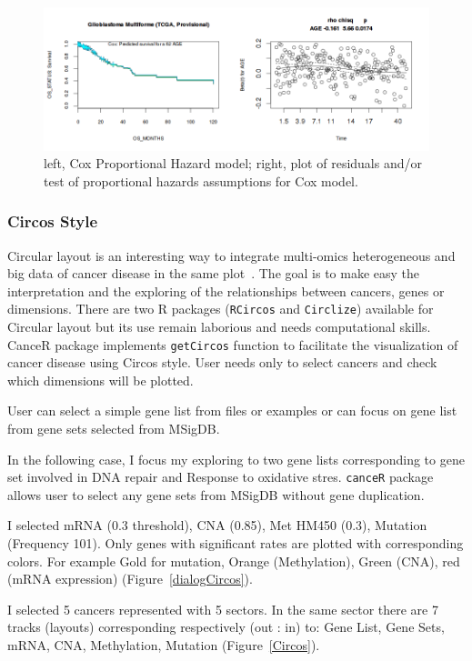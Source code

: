 \documentclass[a4paper]{article}
\begin{document}
 
 \begin{figure}[!ht]
  \centering
 \includegraphics[scale=0.5]{image/Coxph.png}
 \caption{left, Cox Proportional Hazard model; right, plot of residuals and/or test of proportional hazards assumptions for Cox model.}
 \label{Coxph}
 \end{figure}
 
  \subsubsection{Circos Style}
  Circular layout is an interesting way to integrate multi-omics heterogeneous  and big data of cancer disease in the same plot~\cite{Krzywinski2009}. The goal is to make easy the interpretation and the exploring of the relationships between cancers, genes or dimensions. 
There are two R packages (\texttt{RCircos} and \texttt{Circlize}) available for Circular layout but its use remain laborious and needs computational skills. 
CanceR package implements \texttt{getCircos} function to facilitate the visualization of cancer disease using Circos style. User needs only to select cancers and check which dimensions will be plotted.

User can select a simple gene list from files or examples or can focus on gene list from gene sets selected from MSigDB.

In the following case, I  focus my exploring to two gene lists corresponding to gene set involved in DNA repair and Response to oxidative stres. \texttt{canceR} package allows user to select any gene sets from MSigDB without gene duplication.

I selected mRNA (0.3 threshold), CNA (0.85), Met HM450 (0.3), Mutation (Frequency 101). Only genes with significant rates are plotted with corresponding colors. For example Gold for mutation, Orange (Methylation), Green (CNA), red (mRNA expression) (Figure~\ref{dialogCircos}).

I selected 5 cancers represented with 5 sectors. In the same sector there are 7 tracks (layouts) corresponding respectively (out : in) to: Gene List, Gene Sets, mRNA, CNA, Methylation, Mutation (Figure~\ref{Circos}).
\end{document}
